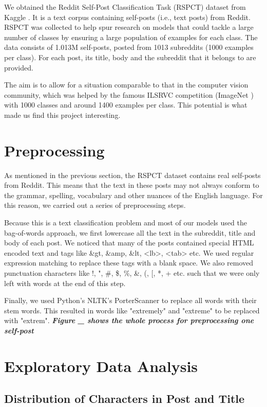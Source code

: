 \documentclass{sig-alternate-05-2015}
\begin{document}
We obtained the Reddit Self-Post Classification Task (RSPCT) dataset from Kaggle \cite{kaggle:dataset}. It is a text corpus containing self-posts (i.e., text posts) from Reddit. RSPCT was collected to help spur research on models that could tackle a large number of classes by ensuring a large population of examples for each class. The data consists of 1.013M self-posts, posted from 1013 subreddits (1000 examples per class). For each post, its title, body and the subreddit that it belongs to are provided.

The aim is to allow for a situation comparable to that in the computer vision community, which was helped by the famous ILSRVC competition (ImageNet \cite{imagenet}) with 1000 classes and around 1400 examples per class. This potential is what made us find this project interesting.

\section{Preprocessing}

As mentioned in the previous section, the RSPCT dataset contains real self-posts from Reddit. This means that the text in these posts may not always conform to the grammar, spelling, vocabulary and other nuances of the English language. For this reason, we carried out a series of preprocessing steps.

Because this is a text classification problem and most of our models used the bag-of-words approach, we first lowercase all the text in the subreddit, title and body of each post. We noticed that many of the posts contained special HTML encoded text and tags like \&gt, \&amp, \&lt, <lb>, <tab> etc. We used regular expression matching to replace these tags with a blank space. We also removed punctuation characters like !, ", \#, \$, \%, \&, (, [, *, + etc. such that we were only left with words at the end of this step.

Finally, we used Python's NLTK's PorterScanner to replace all words with their stem words. This resulted in words like "extremely" and "extreme" to be replaced with "extrem". \textit{\textbf{Figure \_ shows the whole process for preprocessing one self-post}}

\section{Exploratory Data Analysis}

\subsection{Distribution of Characters in Post and Title}
\end{document}
